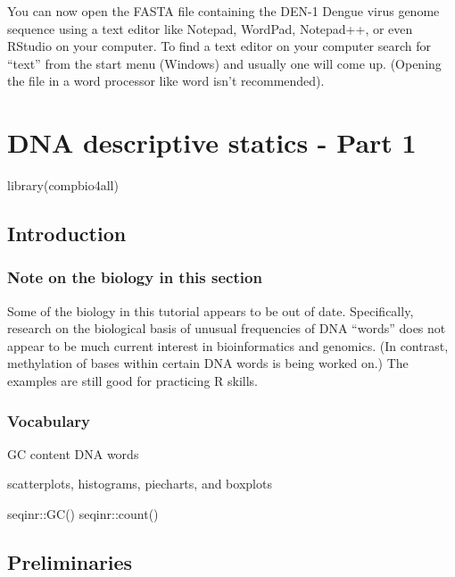\documentclass[
]{book}
\newenvironment{Shaded}{\begin{snugshade}}{\end{snugshade}}
\newcommand{\FunctionTok}[1]{\textcolor[rgb]{0.00,0.00,0.00}{#1}}
\newcommand{\NormalTok}[1]{#1}
\begin{document}
You can now open the FASTA file containing the DEN-1 Dengue virus genome sequence using a text editor like Notepad, WordPad, Notepad++, or even RStudio on your computer. To find a text editor on your computer search for ``text'' from the start menu (Windows) and usually one will come up. (Opening the file in a word processor like word isn't recommended).

\hypertarget{dna-descriptive-statics---part-1}{%
\chapter{DNA descriptive statics - Part 1}\label{dna-descriptive-statics---part-1}}

\begin{Shaded}
\begin{Highlighting}[]
\FunctionTok{library}\NormalTok{(compbio4all)}
\end{Highlighting}
\end{Shaded}

\hypertarget{introduction}{%
\section{Introduction}\label{introduction}}

\hypertarget{note-on-the-biology-in-this-section}{%
\subsection{Note on the biology in this section}\label{note-on-the-biology-in-this-section}}

Some of the biology in this tutorial appears to be out of date. Specifically, research on the biological basis of unusual frequencies of DNA ``words'' does not appear to be much current interest in bioinformatics and genomics. (In contrast, methylation of bases within certain DNA words is being worked on.) The examples are still good for practicing R skills.

\hypertarget{vocabulary-1}{%
\subsection{Vocabulary}\label{vocabulary-1}}

GC content
DNA words

scatterplots, histograms, piecharts, and boxplots

seqinr::GC()
seqinr::count()

\hypertarget{preliminaries}{%
\section{Preliminaries}\label{preliminaries}}
\end{document}

